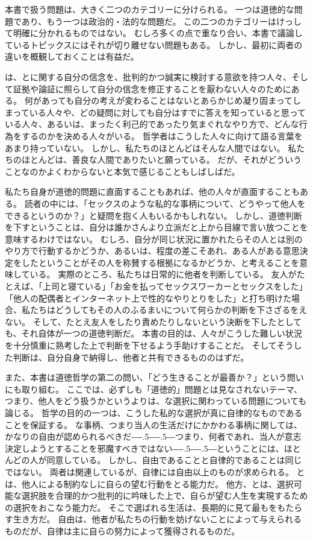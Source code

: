 \documentclass[paper=a4,book,openany]{jlreq}
\def\DDASH{―\kern-.5\zw―\kern-.5\zw―} %
\begin{document}
本書で扱う問題は、大きく二つのカテゴリーに分けられる。
一つは道徳的な問題であり、もう一つは政治的・法的な問題だ。
この二つのカテゴリーはけっして明確に分かれるものではない。
むしろ多くの点で重なり合い、本書で議論しているトピックスにはそれが切り離せない問題もある。
しかし、最初に両者の違いを概観しておくことは有益だ。

は、とに関する自分の信念を、批判的かつ誠実に検討する意欲を持つ人々、そして証拠や論証に照らして自分の信念を修正することを厭わない人々のためにある。
何があっても自分の考えが変わることはないとあらかじめ凝り固まってしまっている人々や、どの疑問に対しても自分はすでに答えを知っていると思っている人々、あるいは、まったく利己的であったり気まぐれなやり方で、どんな行為をするのかを決める人々がいる。
哲学者はこうした人々に向けて語る言葉をあまり持っていない。
しかし、私たちのほとんどはそんな人間ではない。
私たちのほとんどは、善良な人間でありたいと願っている。
だが、それがどういうことなのかよくわからないと本気で感じることもしばしばだ。

私たち自身が道徳的問題に直面することもあれば、他の人々が直面することもある。
読者の中には、「セックスのような私的な事柄について、どうやって他人をできるというのか？」と疑問を抱く人もいるかもしれない。
しかし、道徳判断を下すということは、自分は誰かさんより立派だと上から目線で言い放つことを意味するわけではない。
むしろ、自分が同じ状況に置かれたらその人とは別のやり方で行動するかどうか、あるいは、程度の差こそあれ、ある人がある意思決定をしたということがその人を称賛する根拠になるかどうか、と考えることを意味している。
実際のところ、私たちは日常的に他者を判断している。
友人がたとえば、「上司と寝ている」「お金を払ってセックスワーカーとセックスをした」「他人の配偶者とインターネット上で性的なやりとりをした」と打ち明けた場合、私たちはどうしてもその人のふるまいについて何らかの判断を下さざるをえない。
そして、たとえ友人をしたり責めたりしないという決断を下したとしても、それ自体が一つの道徳判断だ。
本書の目的は、人々がこうした難しい状況を十分慎重に熟考した上で判断を下せるよう手助けすることだ。
そしてそうした判断は、自分自身で納得し、他者と共有できるもののはずだ。

また、本書は道徳哲学の第二の問い、「どう生きることが最善か？」という問いにも取り組む。
ここでは、必ずしも「道徳的」問題とは見なされないテーマ、つまり、他人をどう扱うかというよりは、な選択に関わっている問題についても論じる。
哲学の目的の一つは、こうした私的な選択が真に自律的なものであることを保証する。
な事柄、つまり当人の生活だけにかかわる事柄に関しては、かなりの自由が認められるべきだ{\DDASH}つまり、何者であれ、当人が意志決定しようとすることを邪魔すべきではない{\DDASH}ということには、ほとんどの人が同意している。
しかし、自由であることと自律的であることは同じではない。
両者は関連しているが、自律には自由以上のものが求められる。
とは、他人による制約なしに自らの望む行動をとる能力だ。
他方、とは、選択可能な選択肢を合理的かつ批判的に吟味した上で、自らが望む人生を実現するための選択をおこなう能力だ。
そこで選ばれる生活は、長期的に見て最もをもたらす生き方だ。
自由は、他者が私たちの行動を妨げないことによって与えられるものだが、自律は主に自らの努力によって獲得されるものだ。
\end{document}
